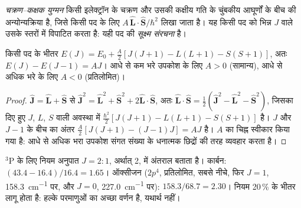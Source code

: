 \begin{definition}[चक्रण--कक्षक युग्मन, सूक्ष्म संरचना]\label{def:b3:many-electron-atoms:spin-orbit}
\emph{चक्रण--कक्षक युग्मन} किसी इलेक्ट्रॉन के
चक्रण और उसकी कक्षीय गति के चुंबकीय आघूर्णों के बीच की अन्योन्यक्रिया है, जिसे किसी
पद के लिए $A\,\hat{\mathbf L}\cdot\hat{\mathbf S}/\hbar^2$ लिखा जाता है। यह
किसी पद को भिन्न $J$ वाले उसके स्तरों में विपाटित करता है: यही पद की \emph{सूक्ष्म
संरचना} है।
\end{definition}

\begin{proposition}[लांडे का अंतराल नियम]\label{prop:b3:many-electron-atoms:lande}
किसी पद के भीतर $E(J) = E_0 + \frac{A}{2}[J(J+1) - L(L+1) - S(S+1)]$, अतः
$E(J) - E(J - 1) = AJ$। आधे से कम भरे उपकोश के लिए $A > 0$ (सामान्य),
आधे से अधिक भरे के लिए $A < 0$ (प्रतिलोमित)।
\end{proposition}

\begin{proof}
$\hat{\mathbf J} = \hat{\mathbf L} + \hat{\mathbf S}$ से $\hat{\mathbf J}^2 =
\hat{\mathbf L}^2 + \hat{\mathbf S}^2 + 2\hat{\mathbf L}\cdot\hat{\mathbf S}$, अतः
$\hat{\mathbf L}\cdot\hat{\mathbf S} = \frac12(\hat{\mathbf J}^2 - \hat{\mathbf L}^2 -
\hat{\mathbf S}^2)$, जिसका दिए हुए $J$, $L$, $S$ वाली अवस्था में 
$\frac{\hbar^2}{2}[J(J+1) - L(L+1) - S(S+1)]$ है। $J$ और
$J - 1$ के बीच का अंतर $\frac A2[J(J+1) - (J-1)J] = AJ$ है। $A$ का चिह्न स्वीकार किया गया है:
आधे से अधिक भरा उपकोश संगत संख्या के धनात्मक
छिद्रों की तरह व्यवहार करता है।
\end{proof}

\begin{example}[अंतराल नियम का परीक्षण]\label{ex:b3:many-electron-atoms:lande-test}
${}^3$P के लिए नियम अनुपात $J = 2 : 1$, अर्थात् 2, में अंतराल बताता है।
कार्बन: $(43.4 - 16.4)/16.4 = 1.65$। ऑक्सीजन ($2p^4$, प्रतिलोमित, 
सबसे नीचे, फिर $J = 1$, \qty{158.3}{cm^{-1}} पर, और $J = 0$, \qty{227.0}{cm^{-1}} पर):
$158.3/68.7 = 2.30$। नियम 20\,\% के भीतर लागू होता है: 
हल्के परमाणुओं का अच्छा वर्णन है, यथार्थ नहीं।
\end{example}

